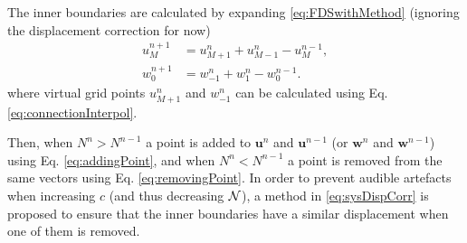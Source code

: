 The inner boundaries are calculated by expanding \eqref{eq:FDSwithMethod} (ignoring the displacement correction for now)
\begin{subequations}\label{eq:innerboundariesExpanded}
    \begin{align}
        u_M^{n+1} &= u_{M+1}^n + u_{M-1}^n - u_M^{n-1},\\
        w_0^{n+1} &= w_{-1}^n + w_{1}^n - w_0^{n-1}.
    \end{align}
\end{subequations}
%
where virtual grid points $u_{M+1}^n$ and $w_{-1}^n$ can be calculated using Eq. \eqref{eq:connectionInterpol}.

Then, when $ N^n > N^{n-1}$ a point is added to $\mathbf{u}^n$ and $\mathbf{u}^{n-1}$ (or $\mathbf{w}^n$ and $\mathbf{w}^{n-1}$) using Eq. \eqref{eq:addingPoint}, and when $ N^n  < N^{n-1} $ a point is removed from the same vectors using Eq. \eqref{eq:removingPoint}. In order to prevent audible artefacts when increasing $c$ (and thus decreasing $\mathcal{N}$), a method in \eqref{eq:sysDispCorr} is proposed to ensure that the inner boundaries have a similar displacement when one of them is removed. 

